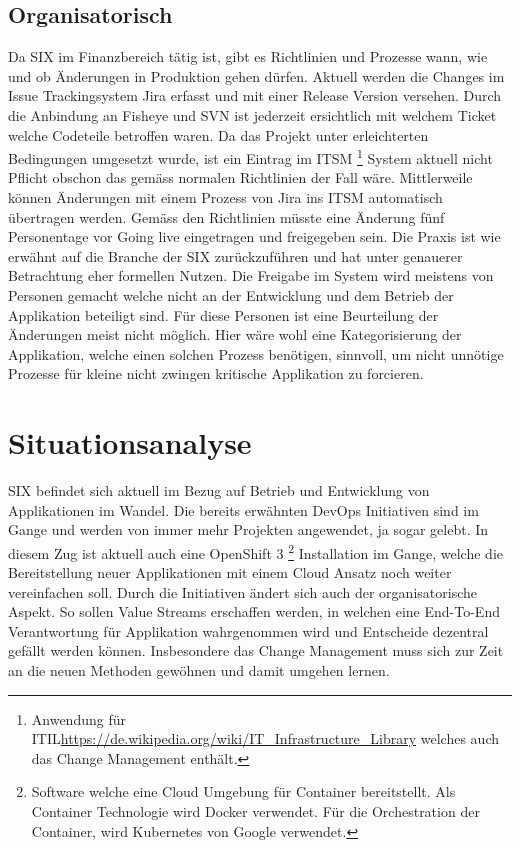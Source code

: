 \subsection{Organisatorisch}

Da SIX im Finanzbereich tätig ist, gibt es Richtlinien und Prozesse wann, wie und ob Änderungen in Produktion gehen dürfen. Aktuell werden die Changes im Issue Trackingsystem Jira erfasst und mit einer Release Version versehen. Durch die Anbindung an Fisheye und SVN ist jederzeit ersichtlich mit welchem Ticket welche Codeteile betroffen waren. Da das Projekt unter erleichterten Bedingungen umgesetzt wurde, ist ein Eintrag im ITSM \footnote{Anwendung für ITIL\url{https://de.wikipedia.org/wiki/IT_Infrastructure_Library} welches auch das Change Management enthält.} System aktuell nicht Pflicht obschon das gemäss normalen Richtlinien der Fall wäre. Mittlerweile können Änderungen mit einem Prozess von Jira ins ITSM automatisch übertragen werden.
Gemäss den Richtlinien müsste eine Änderung fünf Personentage vor Going live eingetragen und freigegeben sein. Die Praxis ist wie erwähnt auf die Branche der SIX zurückzuführen und hat unter genauerer Betrachtung eher formellen Nutzen. Die Freigabe im System wird meistens von Personen gemacht welche nicht an der Entwicklung und dem Betrieb der Applikation beteiligt sind. Für diese Personen ist eine Beurteilung der Änderungen meist nicht möglich. Hier wäre wohl eine Kategorisierung der Applikation, welche einen solchen Prozess benötigen, sinnvoll, um nicht unnötige Prozesse für kleine nicht zwingen kritische Applikation zu forcieren.

\section{Situationsanalyse}

SIX befindet sich aktuell im Bezug auf Betrieb und Entwicklung von Applikationen im Wandel. Die bereits erwähnten DevOps Initiativen sind im Gange und werden von immer mehr Projekten angewendet, ja sogar gelebt. In diesem Zug ist aktuell auch eine OpenShift 3 \footnote{Software welche eine Cloud Umgebung für Container bereitstellt. Als Container Technologie wird Docker verwendet. Für die Orchestration der Container, wird Kubernetes von Google verwendet.} Installation im Gange, welche die Bereitstellung neuer Applikationen mit einem Cloud Ansatz noch weiter vereinfachen soll.
Durch die Initiativen ändert sich auch der organisatorische Aspekt. So sollen Value Streams erschaffen werden, in welchen eine End-To-End Verantwortung für Applikation wahrgenommen wird und Entscheide dezentral gefällt werden können. Insbesondere das Change Management muss sich zur Zeit an die neuen Methoden gewöhnen und damit umgehen lernen.

